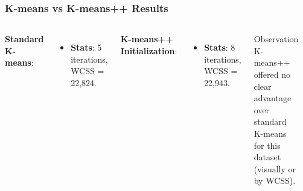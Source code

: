 \documentclass{beamer}
\begin{document}
\begin{frame}
\frametitle{K-means vs K-means++ Results}
    \vspace{1em}
    \begin{columns}[T] %
        \small %
        \textbf{Standard K-means}:
            \begin{itemize}
            \item \textbf{Stats}: 5 iterations, WCSS = 22,824.
            \end{itemize}

        \vspace{1em} %

        \textbf{K-means++ Initialization}:
        \vspace{-1em}
            \begin{itemize}
            \item \textbf{Stats}: 8 iterations, WCSS = 22,943.
            \end{itemize}
        
        \begin{alertblock}{Observation}
            K-means++ offered no clear advantage over standard K-means for this dataset (visually or by WCSS).
        \end{alertblock}
    

        \centering %
        \vspace{-2em}
        \includegraphics[width=\textwidth, height=0.55\textheight]{images/kmeans/kmeans.png} \\
        \vspace{-1em} %
        \includegraphics[width=\textwidth, height=0.55\textheight]{images/kmeans/kmeanspp.png}
    \end{columns}
    

\end{frame}
\end{document}

